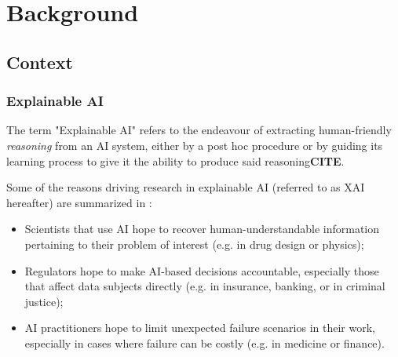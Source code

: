 \documentclass[../main.tex]{subfiles}
\begin{document}
\chapter{Background} %
\label{Chapter1} %


\newcommand{\keyword}[1]{\textbf{#1}}
\newcommand{\tabhead}[1]{\textbf{#1}}
\newcommand{\code}[1]{\texttt{#1}}
\newcommand{\file}[1]{\texttt{\bfseries#1}}
\newcommand{\option}[1]{\texttt{\itshape#1}}

\newcommand{\method}[1]{\texttt{#1}}
\newcommand{\note}[1]{\textbf{#1}}
\newcommand{\citenote}{\note{CITE}}

\newcommand{\CF}[1]{#1^\text{CF}}
\newcommand{\target}{\text{target}}


\section{Context}

\subsection{Explainable AI}

The term "Explainable AI" refers to the endeavour of extracting human-friendly \emph{reasoning} from an AI system, either by a post hoc procedure or by guiding its learning process to give it the ability to produce said reasoning\citenote{}.

Some of the reasons driving research in explainable AI (referred to as XAI hereafter) are summarized in \cite{zhangSurvey2021}:
\begin{itemize}
    \item Scientists that use AI hope to recover human-understandable information pertaining to their problem of interest (e.g. in drug design or physics);
    \item Regulators hope to make AI-based decisions accountable, especially those that affect data subjects directly (e.g. in insurance, banking, or in criminal justice);
    \item AI practitioners hope to limit unexpected failure scenarios in their work, especially in cases where failure can be costly (e.g. in medicine or finance).
\end{itemize}
\end{document}
